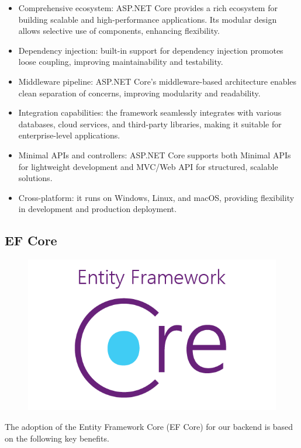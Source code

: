\begin{itemize}

    \item Comprehensive ecosystem: ASP.NET Core provides a rich ecosystem for building scalable and high-performance applications.
    Its modular design allows selective use of components, enhancing flexibility.
    \item Dependency injection: built-in support for dependency injection promotes loose coupling, improving maintainability and testability.
    \item Middleware pipeline: ASP.NET Core's middleware-based architecture enables clean separation of concerns, improving modularity and readability.
    \item Integration capabilities: the framework seamlessly integrates with various databases, cloud services, and third-party libraries, making it suitable for enterprise-level applications.
    \item Minimal APIs and controllers: ASP.NET Core supports both Minimal APIs for lightweight development and MVC/Web API for structured, scalable solutions.
    \item Cross-platform: it runs on Windows, Linux, and macOS, providing flexibility in development and production deployment.

\end{itemize}

\subsection{EF Core}

\begin{figure}[H]
    \hfill
    \includegraphics[width=0.1\linewidth]{../assets/tools-logos/ef-core.png}
    \hspace{1cm}
\end{figure}

The adoption of the Entity Framework Core (EF Core) for our backend is based on the following key benefits.

